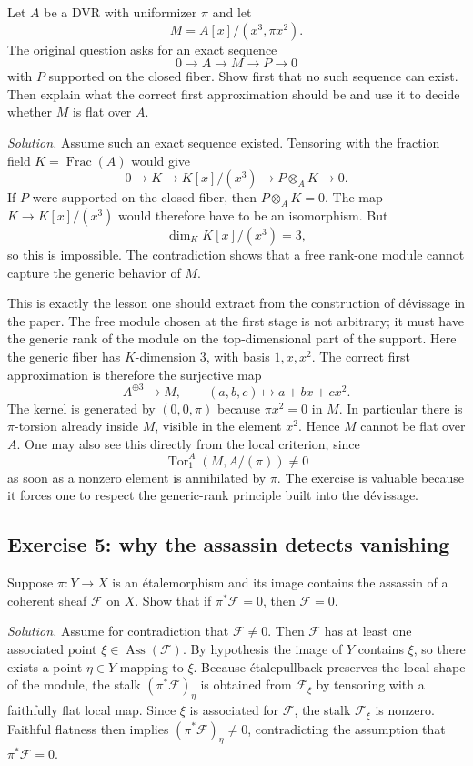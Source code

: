 \documentclass[11pt,oneside]{article}
\newcommand{\F}{\mathcal F}
\newcommand{\Ass}{\operatorname{Ass}}
\newcommand{\Tor}{\operatorname{Tor}}
\newcommand{\ot}{\otimes}
\newcommand{\etale}{\'etale}
\begin{document}
Let $A$ be a DVR with uniformizer $\pi$ and let
\[
M=A[x]/(x^3,\pi x^2).
\]
The original question asks for an exact sequence
\[
0\to A\to M\to P\to 0
\]
with $P$ supported on the closed fiber.  Show first that no such sequence can exist.  Then explain what the correct first approximation should be and use it to decide whether $M$ is flat over $A$.

\emph{Solution.}  Assume such an exact sequence existed.  Tensoring with the fraction field $K=\operatorname{Frac}(A)$ would give
\[
0\to K\to K[x]/(x^3)\to P\ot_A K\to 0.
\]
If $P$ were supported on the closed fiber, then $P\ot_A K=0$.  The map $K\to K[x]/(x^3)$ would therefore have to be an isomorphism.  But
\[
\dim_K K[x]/(x^3)=3,
\]
so this is impossible.  The contradiction shows that a free rank-one module cannot capture the generic behavior of $M$.

This is exactly the lesson one should extract from the construction of d\'evissage in the paper.  The free module chosen at the first stage is not arbitrary; it must have the generic rank of the module on the top-dimensional part of the support.  Here the generic fiber has $K$-dimension $3$, with basis $1,x,x^2$.  The correct first approximation is therefore the surjective map
\[
A^{\oplus 3}\longrightarrow M,
\qquad (a,b,c)\longmapsto a+bx+cx^2.
\]
The kernel is generated by $(0,0,\pi)$ because $\pi x^2=0$ in $M$.  In particular there is $\pi$-torsion already inside $M$, visible in the element $x^2$.  Hence $M$ cannot be flat over $A$.  One may also see this directly from the local criterion, since
\[
\Tor_1^A(M,A/(\pi))\neq 0
\]
as soon as a nonzero element is annihilated by $\pi$.  The exercise is valuable because it forces one to respect the generic-rank principle built into the d\'evissage.

\subsection*{Exercise 5: why the assassin detects vanishing}

Suppose $\pi\colon Y\to X$ is an \etale morphism and its image contains the assassin of a coherent sheaf $\F$ on $X$.  Show that if $\pi^*\F=0$, then $\F=0$.

\emph{Solution.}  Assume for contradiction that $\F\neq 0$.  Then $\F$ has at least one associated point $\xi\in \Ass(\F)$.  By hypothesis the image of $Y$ contains $\xi$, so there exists a point $\eta\in Y$ mapping to $\xi$.  Because \etale pullback preserves the local shape of the module, the stalk $(\pi^*\F)_\eta$ is obtained from $\F_\xi$ by tensoring with a faithfully flat local map.  Since $\xi$ is associated for $\F$, the stalk $\F_\xi$ is nonzero.  Faithful flatness then implies $(\pi^*\F)_\eta\neq 0$, contradicting the assumption that $\pi^*\F=0$.
\end{document}
